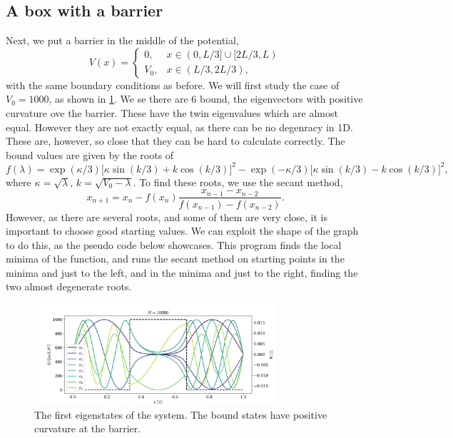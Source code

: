 \documentclass{article}
\begin{document}
\subsection*{A box with a barrier}
    Next, we put a barrier in the middle of the potential,
    \begin{equation*}
        V(x) = 
        \begin{cases}
            0, & x \in (0, L/3] \cup [2L/3, L) \\
            V_0, & x \in (L/3, 2L/3),
        \end{cases}
    \end{equation*}
    with the same boundary conditions as before. We will first study the case of $V_0 = 1000$, as shown in \ref{fig:eigenvecs box w barrier}. We se there are 6 bound, the eigenvectors with positive curvature ove the barrier. These have the twin eigenvalues which are almost equal. However they are not exactly equal, as there can be no degenracy in 1D. These are, however, so close that they can be hard to calculate correctly. The bound values are given by the roots of
    \begin{equation*}
        f(\lambda) = \exp(\kappa/3)\bigg[\kappa \sin(k/3)+k \cos(k/3)\bigg]^2 - \exp(-\kappa/3)\bigg[\kappa \sin(k/3) - k \cos(k/3)\bigg]^2,
    \end{equation*}
    where $\kappa = \sqrt{\lambda}, \, k = \sqrt{V_0 - \lambda}$. To find these roots, we use the secant method, 
    \begin{equation*}
        x_{n+1} = x_{n} - f(x_{n}) \frac{x_{n-1} - x_{n-2}}{f(x_{n-1}) - f(x_{n-2})}.
    \end{equation*}
    However, as there are several roots, and some of them are very close, it is important to choose good starting values. We can exploit the shape of the graph to do this, as the pseudo code below showcases. This program finds the local minima of the function, and runs the secant method on starting points in the minima and just to the left, and in the minima and just to the right, finding the two almost degenerate roots.

    \begin{figure}[ht]
        \centering
        \includegraphics[width=0.80\textwidth]{box_w_barrier/eigenvecs}
        \caption{The first eigenstates of the system. The bound states have positive curvature at the barrier.}
        \label{fig:eigenvecs box w barrier}
    \end{figure}
\end{document}
